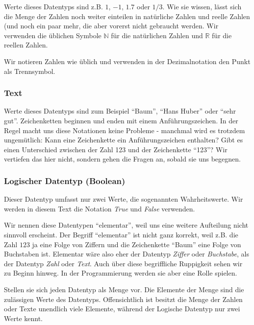 \documentclass[
  oneside]{book}
\begin{document}
Werte dieses Datentyps sind z.B. \(1\), \(-1\), \(1.7\) oder \(1/3\). Wie sie wissen, lässt sich die Menge der Zahlen noch weiter einteilen in natürliche Zahlen und reelle Zahlen (und noch ein paar mehr, die aber vorerst nicht gebraucht werden. Wir verwenden die üblichen Symbole \(\mathbb{N}\) für die natürlichen Zahlen und \(\mathbb{R}\) für die reellen Zahlen.

Wir notieren Zahlen wie üblich und verwenden in der Dezimalnotation den Punkt als Trennsymbol.

\hypertarget{text}{%
\subsubsection*{\texorpdfstring{\textbf{Text}}{Text}}\label{text}}

Werte dieses Datentyps sind zum Beispiel ``Baum'', ``Hans Huber'' oder ``sehr gut''. Zeichenketten beginnen und enden mit einem Anführungszeichen. In der Regel macht uns diese Notationen keine Probleme - manchmal wird es trotzdem ungemütlich: Kann eine Zeichenkette ein Anführungszeichen enthalten? Gibt es einen Unterschied zwischen der Zahl 123 und der Zeichenkette ``123''? Wir vertiefen das hier nicht, sondern gehen die Fragen an, sobald sie uns begegnen.

\hypertarget{logischer-datentyp-boolean}{%
\subsubsection*{\texorpdfstring{\textbf{Logischer Datentyp (Boolean)}}{Logischer Datentyp (Boolean)}}\label{logischer-datentyp-boolean}}

Dieser Datentyp umfasst nur zwei Werte, die sogenannten Wahrheitswerte. Wir werden in diesem Text die Notation \emph{True} und \emph{False} verwenden.

Wir nennen diese Datentypen ``elementar'', weil uns eine weitere Aufteilung nicht sinnvoll erscheint. Der Begriff ``elementar'' ist nicht ganz korrekt, weil z.B. die Zahl \(123\) ja eine Folge von Ziffern und die Zeichenkette ``Baum'' eine Folge von Buchstaben ist. Elementar wäre also eher der Datentyp \emph{Ziffer} oder \emph{Buchstabe}, als der Datentyp \emph{Zahl} oder \emph{Text}. Auch über diese begriffliche Ruppigkeit sehen wir zu Beginn hinweg. In der Programmierung werden sie aber eine Rolle spielen.

Stellen sie sich jeden Datentyp als Menge vor. Die Elemente der Menge sind die zulässigen Werte des Datentyps. Offensichtlich ist besitzt die Menge der Zahlen oder Texte unendlich viele Elemente, während der Logische Datentyp nur zwei Werte kennt.
\end{document}
